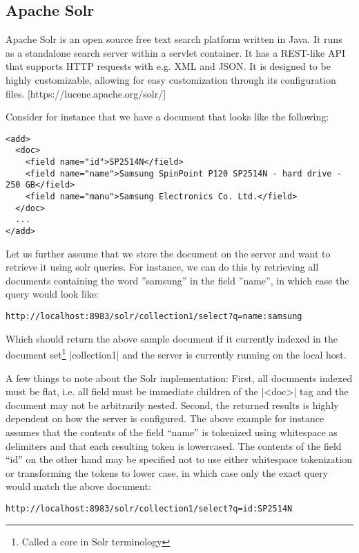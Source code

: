 \subsection{Apache Solr}

Apache Solr is an open source free text search platform written in Java. It runs as a standalone search server within a servlet container. It has a REST-like API that supports HTTP requests with e.g. XML and JSON. It is designed to be highly customizable, allowing for easy customization through its configuration files.
[https://lucene.apache.org/solr/]

Consider for instance that we have a document that looks like the following:

\begin{verbatim}
<add>
  <doc>
    <field name="id">SP2514N</field>
    <field name="name">Samsung SpinPoint P120 SP2514N - hard drive - 250 GB</field>
    <field name="manu">Samsung Electronics Co. Ltd.</field>
  </doc>
  ...
</add>
\end{verbatim}

Let us further assume that we store the document on the server and want to retrieve it using solr queries. For instance, we can do this by retrieving all documents containing the word ''samsung'' in the field ''name'', in which case the query would look like:

\begin{verbatim}
http://localhost:8983/solr/collection1/select?q=name:samsung
\end{verbatim}

Which should return the above sample document if it currently indexed in the document set\footnote{Called a core in Solr terminology} |collection1| and the server is currently running on the local host.

A few things to note about the Solr implementation: First, all documents indexed must be flat, i.e. all  field must be immediate children of the |<doc>| tag and the document may not be arbitrarily nested. Second, the returned results is highly dependent on how the server is configured. The above example for instance assumes that the contents of the field “name” is tokenized using whitespace as delimiters and that each resulting token is lowercased. The contents of the field “id” on the other hand may be specified not to use either whitespace tokenization or transforming the tokens to lower case, in which case only the exact query would match the above document:

\begin{verbatim}
http://localhost:8983/solr/collection1/select?q=id:SP2514N
\end{verbatim}










